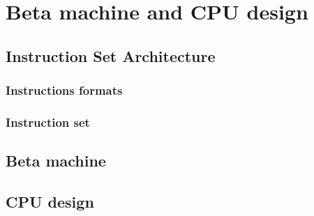 \chapter{Beta machine and CPU design}

\section{Instruction Set Architecture}

\subsection{Instructions formats}

\subsection{Instruction set}

\section{Beta machine}

\section{CPU design}
